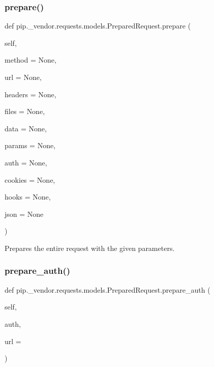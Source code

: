 \subsubsection{\texorpdfstring{prepare()}{prepare()}}
{\footnotesize\ttfamily def pip.\+\_\+vendor.\+requests.\+models.\+Prepared\+Request.\+prepare (\begin{DoxyParamCaption}\item[{}]{self,  }\item[{}]{method = {\ttfamily None},  }\item[{}]{url = {\ttfamily None},  }\item[{}]{headers = {\ttfamily None},  }\item[{}]{files = {\ttfamily None},  }\item[{}]{data = {\ttfamily None},  }\item[{}]{params = {\ttfamily None},  }\item[{}]{auth = {\ttfamily None},  }\item[{}]{cookies = {\ttfamily None},  }\item[{}]{hooks = {\ttfamily None},  }\item[{}]{json = {\ttfamily None} }\end{DoxyParamCaption})}

\begin{DoxyVerb}Prepares the entire request with the given parameters.\end{DoxyVerb}
 \mbox{\label{classpip_1_1__vendor_1_1requests_1_1models_1_1PreparedRequest_a007643c8504906ad579967187965d2c9}} 
\subsubsection{\texorpdfstring{prepare\+\_\+auth()}{prepare\_auth()}}
{\footnotesize\ttfamily def pip.\+\_\+vendor.\+requests.\+models.\+Prepared\+Request.\+prepare\+\_\+auth (\begin{DoxyParamCaption}\item[{}]{self,  }\item[{}]{auth,  }\item[{}]{url = {\ttfamily \textquotesingle{}\textquotesingle{}} }\end{DoxyParamCaption})}

